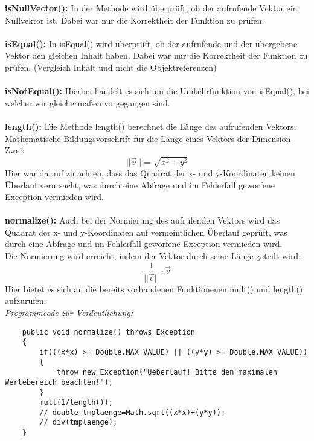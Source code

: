 \documentclass[a4paper,11pt]{scrartcl}
\begin{document}
\textbf{isNullVector(): } In der Methode wird überprüft, ob der aufrufende Vektor ein Nullvektor ist. Dabei war nur die Korrektheit der Funktion zu prüfen.\\
\\
\textbf{isEqual(): } In isEqual() wird überprüft, ob der aufrufende und der übergebene Vektor den gleichen Inhalt haben. Dabei war nur die Korrektheit der Funktion zu prüfen. (Vergleich Inhalt und nicht die Objektreferenzen)\\
\\
\textbf{isNotEqual(): } Hierbei handelt es sich um die Umkehrfunktion von isEqual(), bei welcher wir gleichermaßen vorgegangen sind.\\
\\
\textbf{length(): } Die Methode length() berechnet die Länge des aufrufenden Vektors.\\
Mathematische Bildungsvorschrift für die Länge eines Vektors der Dimension Zwei:
\[ ||\vec v|| = \sqrt{x^2 + y^2} \]
Hier war darauf zu achten, dass das Quadrat der x- und y-Koordinaten keinen Überlauf verursacht, was durch eine Abfrage und im Fehlerfall geworfene Exception vermieden wird.\\
\\
\textbf{normalize(): } Auch bei der Normierung des aufrufenden Vektors wird das Quadrat der x- und y-Koordinaten auf vermeintlichen Überlauf geprüft, was durch eine Abfrage und im Fehlerfall geworfene Exception vermieden wird.\\
Die Normierung wird erreicht, indem der Vektor durch seine Länge geteilt wird:
\[ \frac{1}{||\vec v||} \cdot \vec v \]
Hier bietet es sich an die bereits vorhandenen Funktionenen mult() und length() aufzurufen.\\
\textit{Programmcode zur Verdeutlichung:}
\begin{lstlisting}
	public void normalize() throws Exception
	{
		if(((x*x) >= Double.MAX_VALUE) || ((y*y) >= Double.MAX_VALUE))
		{
			throw new Exception("Ueberlauf! Bitte den maximalen Wertebereich beachten!");
		}
		mult(1/length());
		// double tmplaenge=Math.sqrt((x*x)+(y*y)); 		
		// div(tmplaenge);
	}
\end{lstlisting}
\end{document}

